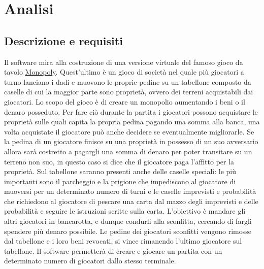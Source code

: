 \chapter{Analisi}

\section{Descrizione e requisiti}
Il software mira alla costruzione di una versione virtuale del famoso gioco da tavolo \href{https://it.wikipedia.org/wiki/Monopoly}{Monopoly}. 
Quest’ultimo è un gioco di società nel quale più giocatori a turno lanciano i dadi e muovono le proprie pedine su un tabellone 
composto da caselle di cui la maggior parte sono proprietà, ovvero dei terreni acquistabili dai giocatori.
Lo scopo del gioco è di creare un monopolio aumentando i beni o il denaro posseduto. 
Per fare ciò durante la partita i giocatori possono acquistare le proprietà sulle quali capita la propria pedina pagando una somma alla banca, 
una volta acquistate il giocatore può anche decidere se eventualmente migliorarle.
Se la pedina di un giocatore finisce su una proprietà in possesso di un suo avversario allora sarà costretto
a pagargli una somma di denaro per poter transitare su un terreno non suo, in questo caso si dice che il giocatore
paga l'affitto per la proprietà.\newline
Sul tabellone saranno presenti anche delle caselle speciali: le più importanti sono il parcheggio e la prigione che
impediscono al giocatore di muoversi per un determinato numero di turni e le caselle imprevisti e probabilità che 
richiedono al giocatore di pescare una carta dal mazzo degli imprevisti e delle probabilità e seguire le 
istruzioni scritte sulla carta.\newline
L’obiettivo è mandare gli altri giocatori in bancarotta, e dunque condurli alla sconfitta, cercando di fargli spendere
più denaro possibile. Le pedine dei giocatori sconfitti vengono rimosse dal tabellone e i loro 
beni revocati, si vince rimanendo l'ultimo giocatore sul tabellone.\newline
Il software permetterà di creare e giocare un partita con un determinato numero di giocatori dallo 
stesso terminale.


